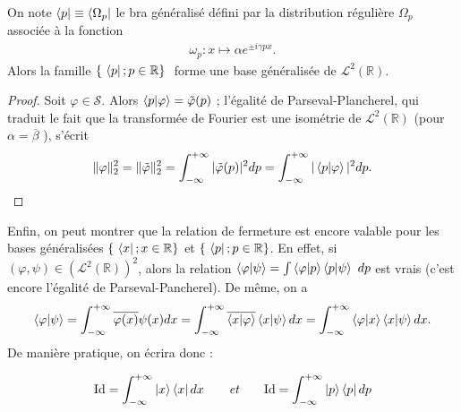 \begin{Theo} On note $\bra{p} \equiv \bra{ \Omega_p}$ le bra généralisé défini par la distribution régulière $\Omega_p$ associée à la fonction 
    \begin{eqnarray}
        \omega_p \colon x \mapsto \alpha e^{\pm i \gamma p x }.
    \end{eqnarray} 
    Alors la famille $\{ \bra{p} ; p \in \mathbb R\} $ forme une base généralisée de $\mathcal L^2(\mathbb R)$.
\end{Theo}
\begin{proof}
    Soit $\varphi \in \mathscr S$. Alors $\braket{p\vert \varphi} = \tilde \varphi (p)$ ; l'égalité de Parseval-Plancherel, qui traduit le fait que la transformée de Fourier est une isométrie de $\mathcal L^2(\mathbb R)$ (pour $ \alpha = \overline{\beta}$ ), s'écrit 
    \begin{eqnarray}
        \Vert \varphi \Vert_2^2 = \Vert \tilde \varphi \Vert_2^2 = \int_{-\infty}^{+\infty} \vert \tilde \varphi (p) \vert^2 dp = \int_{-\infty}^{+\infty} \vert \braket{p \vert \varphi } \vert^2 dp .
    \end{eqnarray} 
\end{proof}
Enfin, on peut montrer que la relation de fermeture est encore valable pour les bases généralisées $\{ \bra{x} ; x \in \mathbb R\}$ et $\{ \bra{p} ; p \in \mathbb R\}$. En effet, si $(\varphi,\psi) \in (\mathcal L^2(\mathbb R))^2$, alors la relation $\braket{\varphi \vert \psi } = \int \braket{\varphi \vert p}\braket{ p \vert \psi } dp $ est vrais (c'est encore l'égalité de Parseval-Pancherel). De même, on a 
\begin{eqnarray}
    \braket{\varphi \vert \psi } = \int_{-\infty}^{+\infty} \overline{\varphi(x)} \psi (x) dx = \int_{-\infty}^{+\infty} \overline{\braket{x\vert \varphi}} \braket{x\vert \psi} dx = \int_{-\infty}^{+\infty} \braket{\varphi \vert x } \braket{x\vert \psi} dx .
\end{eqnarray}
De manière pratique, on écrira donc :
\begin{Theo} 
    \begin{eqnarray}
        \mathrm{Id} = \int_{-\infty} ^{+\infty} \ket{x}\bra{x} dx \qquad \mbox{\em et} \qquad  \mathrm{Id} =\int_{-\infty} ^{+\infty} \ket{p}\bra{p} dp 
    \end{eqnarray} 
\end{Theo}
